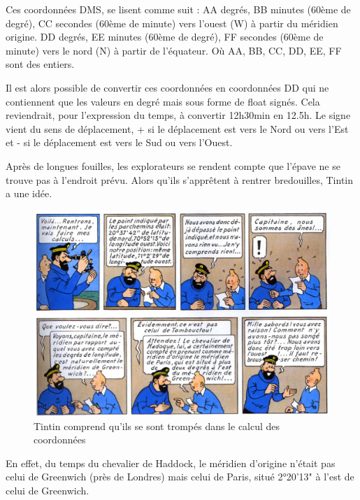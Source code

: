 Ces coordonnées DMS, se lisent comme suit : AA degrés, BB minutes (60ème de degré), CC secondes (60ème de minute) vers l'ouest (W) à partir du méridien origine. DD degrés, EE minutes (60ème de degré), FF secondes (60ème de minute) vers le nord (N) à partir de l'équateur. Où AA, BB, CC, DD, EE, FF sont des entiers.

Il est alors possible de convertir ces coordonnées en coordonnées DD qui ne contiennent que les valeurs en degré mais sous forme de float signés. Cela reviendrait, pour l'expression du temps, à convertir 12h30min en 12.5h. Le signe vient du sens de déplacement, \og + \fg si le déplacement est vers le Nord ou vers l'Est et \og - \fg si le déplacement est vers le Sud ou vers l'Ouest. 


\newpage

Après de longues fouilles, les explorateurs se rendent compte que l'épave ne se trouve pas à l'endroit prévu. Alors qu'ils s'apprêtent à rentrer bredouilles, Tintin a une idée.

\begin{figure}[ht!]
\begin{center}
 \includegraphics[width=.8\textwidth]{img/erreur_coordonnees}
\end{center}
\vspace{-0.8cm}
\caption{\label{fig03} Tintin comprend qu'ils se sont trompés dans le calcul des coordonnées}
\end{figure}

En effet, du temps du chevalier de Haddock, le méridien d'origine n'était pas celui de Greenwich (près de Londres) mais celui de Paris, situé 2°20'13" à l'est de celui de Greenwich.

